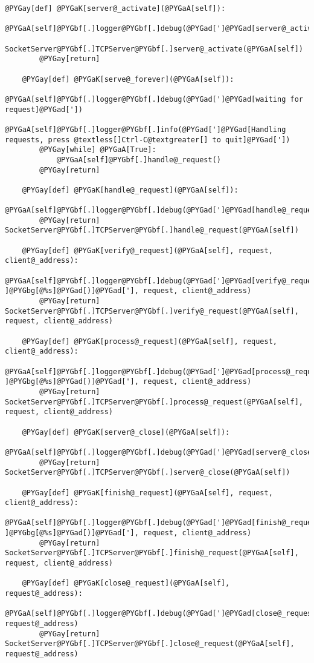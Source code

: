 \documentclass[a4paper,10pt,english]{manual}
\begin{document}
\begin{Verbatim}[commandchars=@\[\]]
    @PYGay[def] @PYGaK[server@_activate](@PYGaA[self]):
        @PYGaA[self]@PYGbf[.]logger@PYGbf[.]debug(@PYGad[']@PYGad[server@_activate]@PYGad['])
        SocketServer@PYGbf[.]TCPServer@PYGbf[.]server@_activate(@PYGaA[self])
        @PYGay[return]

    @PYGay[def] @PYGaK[serve@_forever](@PYGaA[self]):
        @PYGaA[self]@PYGbf[.]logger@PYGbf[.]debug(@PYGad[']@PYGad[waiting for request]@PYGad['])
        @PYGaA[self]@PYGbf[.]logger@PYGbf[.]info(@PYGad[']@PYGad[Handling requests, press @textless[]Ctrl-C@textgreater[] to quit]@PYGad['])
        @PYGay[while] @PYGaA[True]:
            @PYGaA[self]@PYGbf[.]handle@_request()
        @PYGay[return]

    @PYGay[def] @PYGaK[handle@_request](@PYGaA[self]):
        @PYGaA[self]@PYGbf[.]logger@PYGbf[.]debug(@PYGad[']@PYGad[handle@_request]@PYGad['])
        @PYGay[return] SocketServer@PYGbf[.]TCPServer@PYGbf[.]handle@_request(@PYGaA[self])

    @PYGay[def] @PYGaK[verify@_request](@PYGaA[self], request, client@_address):
        @PYGaA[self]@PYGbf[.]logger@PYGbf[.]debug(@PYGad[']@PYGad[verify@_request(]@PYGbg[@%s]@PYGad[, ]@PYGbg[@%s]@PYGad[)]@PYGad['], request, client@_address)
        @PYGay[return] SocketServer@PYGbf[.]TCPServer@PYGbf[.]verify@_request(@PYGaA[self], request, client@_address)

    @PYGay[def] @PYGaK[process@_request](@PYGaA[self], request, client@_address):
        @PYGaA[self]@PYGbf[.]logger@PYGbf[.]debug(@PYGad[']@PYGad[process@_request(]@PYGbg[@%s]@PYGad[, ]@PYGbg[@%s]@PYGad[)]@PYGad['], request, client@_address)
        @PYGay[return] SocketServer@PYGbf[.]TCPServer@PYGbf[.]process@_request(@PYGaA[self], request, client@_address)

    @PYGay[def] @PYGaK[server@_close](@PYGaA[self]):
        @PYGaA[self]@PYGbf[.]logger@PYGbf[.]debug(@PYGad[']@PYGad[server@_close]@PYGad['])
        @PYGay[return] SocketServer@PYGbf[.]TCPServer@PYGbf[.]server@_close(@PYGaA[self])

    @PYGay[def] @PYGaK[finish@_request](@PYGaA[self], request, client@_address):
        @PYGaA[self]@PYGbf[.]logger@PYGbf[.]debug(@PYGad[']@PYGad[finish@_request(]@PYGbg[@%s]@PYGad[, ]@PYGbg[@%s]@PYGad[)]@PYGad['], request, client@_address)
        @PYGay[return] SocketServer@PYGbf[.]TCPServer@PYGbf[.]finish@_request(@PYGaA[self], request, client@_address)

    @PYGay[def] @PYGaK[close@_request](@PYGaA[self], request@_address):
        @PYGaA[self]@PYGbf[.]logger@PYGbf[.]debug(@PYGad[']@PYGad[close@_request(]@PYGbg[@%s]@PYGad[)]@PYGad['], request@_address)
        @PYGay[return] SocketServer@PYGbf[.]TCPServer@PYGbf[.]close@_request(@PYGaA[self], request@_address)
\end{Verbatim}
\end{document}
